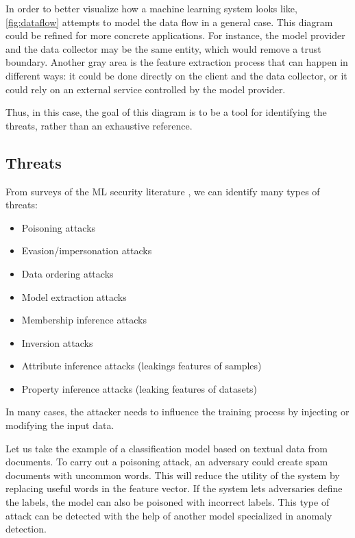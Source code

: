 \documentclass[a4paper,11pt,oneside]{report}
\begin{document}
In order to better visualize how a machine learning system looks like, \autoref{fig:dataflow} attempts to model the data flow in a general case. 
This diagram could be refined for more concrete applications. 
For instance, the model provider and the data collector may be the same entity, which would remove a trust boundary. 
Another gray area is the feature extraction process that can happen in different ways: it could be done directly on the client and the data collector, or it could rely on an external service controlled by the model provider.

Thus, in this case, the goal of this diagram is to be a tool for identifying the threats, rather than an exhaustive reference.

\subsection{Threats}\label{sec:threats}

From surveys of the ML security literature \cite{liu_survey_2018, rigaki_survey_2021}, we can identify many types of threats:

\begin{itemize}
    \item Poisoning attacks
    \item Evasion/impersonation attacks
    \item Data ordering attacks
    \item Model extraction attacks
    \item Membership inference attacks
    \item Inversion attacks
    \item Attribute inference attacks (leakings features of samples)
    \item Property inference attacks (leaking features of datasets)
\end{itemize}

In many cases, the attacker needs to influence the training process by injecting or modifying the input data.

Let us take the example of a classification model based on textual data from documents. 
To carry out a poisoning attack, an adversary could create spam documents with uncommon words. 
This will reduce the utility of the system by replacing useful words in the feature vector. 
If the system lets adversaries define the labels, the model can also be poisoned with incorrect labels. 
This type of attack can be detected with the help of another model specialized in anomaly detection.
\end{document}
